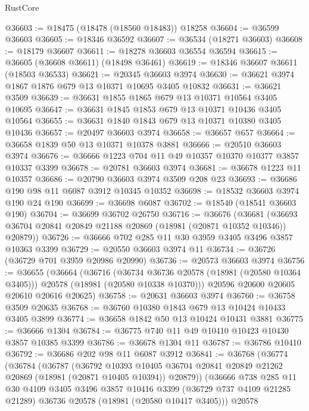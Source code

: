 \begin{lexlean}{RustCore}
\begin{coremodule}
@36603 := @18475 (@18478 (@18560 @18483)) @18258
@36604 := @36599 @36603
@36605 := @18346 @36592
@36607 := @36534 (@18271 @36603)
@36608 := @18179 @36607
@36611 := @18278 @36603 @36554 @36594
@36615 := @36605 (@36608 @36611) (@18498 @36461)
@36619 := @18346 @36607 @36611 (@18503 @36533)
@36621 := @20345 @36603 @3974
@36630 := @36621 @3974 @1867 @1876 @679 @13 @10371 @10695 @3405 @10832
@36631 := @36621 @3509
@36639 := @36631 @1855 @1865 @679 @13 @10371 @10564 @3405 @10695
@36647 := @36631 @1845 @1853 @679 @13 @10371 @10436 @3405 @10564
@36655 := @36631 @1840 @1843 @679 @13 @10371 @10380 @3405 @10436
@36657 := @20497 @36603 @3974
@36658 := @36657 @657
@36664 := @36658 @1839 @50 @13 @10371 @10378 @3881
@36666 := @20510 @36603 @3974
@36676 := @36666 @1223 @704 @11 @49 @10357 @10370 @10377 @3857 @10337 @3399
@36678 := @20781 @36603 @3974
@36681 := @36678 @1223 @11 @10357
@36686 := @20790 @36603 @3974 @3509 @208 @23
@36693 := @36686 @190 @98 @11 @6087 @3912 @10345 @10352
@36698 := @18532 @36603 @3974 @190 @24 @190
@36699 := @36698 @6087
@36702 := @18540 (@18541 @36603 @190)
@36704 := @36699 @36702 @26750
@36716 := @36676
    (@36681 (@36693 @36704 @20841 @20849 @21188 @20869 (@18981 (@20871 @10352 @10346)) @20879))
@36726 := @36666 @702 @285 @11 @30 @3959 @3405 @3496 @3857 @10363 @3399
@36729 := @20550 @36603 @3974 @11
@36734 := @36726 (@36729 @701 @3959 @20986 @20990)
@36736 := @20573 @36603 @3974
@36756 := @36655
    (@36664
      (@36716
        (@36734 @36736 @20578 (@18981 (@20580 @10364 @3405)))
        @20578
        (@18981 (@20580 @10338 @10370)))
      @20596
      @20600
      @20605
      @20610
      @20616
      @20625)
@36758 := @20631 @36603 @3974
@36760 := @36758 @3509 @20635
@36768 := @36760 @10380 @1843 @679 @13 @10424 @10433 @3405 @3899
@36774 := @36658 @1842 @50 @13 @10424 @10431 @3881
@36775 := @36666 @1304
@36784 := @36775 @740 @11 @49 @10410 @10423 @10430 @3857 @10385 @3399
@36786 := @36678 @1304 @11
@36787 := @36786 @10410
@36792 := @36686 @202 @98 @11 @6087 @3912
@36841 := @36768
    (@36774
      (@36784
        (@36787
          (@36792
            @10393
            @10405
            @36704
            @20841
            @20849
            @21262
            @20869
            (@18981 (@20871 @10405 @10394))
            @20879))
        (@36666
          @738
          @285
          @11
          @30
          @4109
          @3405
          @3496
          @3857
          @10416
          @3399
          (@36729 @737 @4109 @21285 @21289)
          @36736
          @20578
          (@18981 (@20580 @10417 @3405)))
        @20578

\end{coremodule}
\end{lexlean}

